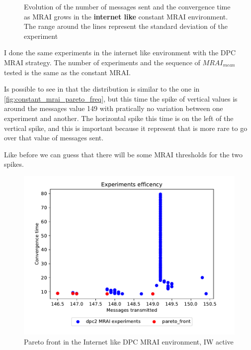 \documentclass[10pt,conference,letterpaper]{IEEEtran}
\newcommand{\figwidth}{0.78}
\newcommand{\figvspace}{-1.5em}
\begin{document}
\begin{figure}[tb]
	\caption{Evolution of the number of messages sent and the convergence time as \ac{MRAI} grows
		in the \textbf{internet like} constant \ac{MRAI} environment. The range around the lines
		represent the standard deviation of the experiment
		}
	\label{fig:constant_mrai_evolution_std}
	\vspace{\figvspace}
\end{figure}

I done the same experiments in the internet like environment with the \ac{DPC}
\ac{MRAI} strategy. The number of experiments and the sequence of $MRAI_{mean}$
tested is the same as the constant \ac{MRAI}.

Is possible to see in  that the distribution is
similar to the one in \cref{fig:constant_mrai_pareto_freq}, but this
time the spike of vertical values is around the messages value \num{149} with
pratically no variation between one experiment and another.
The horizontal spike this time is on the left of the vertical spike, and this
is important because it represent that is more rare to go over that value of
messages sent.

Like before we can guess that there will be some \ac{MRAI} thresholds for the 
two spikes.

\begin{figure}[tb]
	\centering
	\includegraphics[width=\figwidth\columnwidth]{images/internet_like/graph-100-dpc/pareto-internet_like-dpc}
	\caption{Pareto front in the Internet like \ac{DPC} \ac{MRAI} environment, IW active}
	\label{fig:dpc_mrai_pareto_freq}
	\vspace{\figvspace}
\end{figure}
\end{document}
